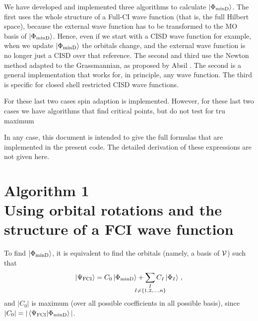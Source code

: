 We have developed and implemented three algorithms to calculate $\ket{\Phi_\text{minD}}$.
The first uses the whole structure of a Full-CI wave function (that is, the full Hilbert space), because the external wave function has to be transformed to the MO basis of $\ket{\Phi_\text{minD}}$.
Hence, even if we start with a CISD wave function for example, when we update $\ket{\Phi_\text{minD}}$ the orbitals change, and the external wave function is no longer just a CISD over that reference.
The second and third use the Newton method adapted to the Grassmannian, as proposed by Absil \etal{} \cite{}.
The second is a general implementation that works for, in principle, any wave function.
The third is specific for closed shell restricted CISD wave functions.

For these last two cases spin adaption is implemented.
However, for these last two cases we have algorithms that find critical points, but do not test for tru maximum

In any case, this document is intended to give the full formulas that are implemented in the present code.
The detailed derivation of these expressions are not given here.


\newpage
\section{\textsf{\LARGE Algorithm 1}\\Using orbital rotations and the structure of a FCI wave function}

To find $\ket{\Phi_\text{minD}}$, it is equivalent to find the orbitals (namely, a basis of $\mathcal{V}{}$) such that 
\begin{equation}
  \ket{\Psi_\text{FCI}} = C_0 \ket{\Phi_\text{minD}} +
  \sum_{
    \mathclap{\substack{I\\
        I \ne \{1,2,\dots,n\}}}
      }
    C_I \ket{\Phi_I}\,,
\end{equation}
and $|C_0|$ is maximum (over all possible coefficients in all possible basis), since $|C_0| = |\innerproduct{\Psi_\text{FCI}}{\Phi_\text{minD}}|$.

